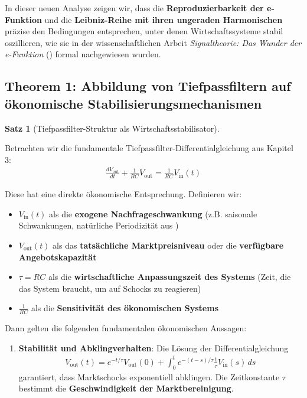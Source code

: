 \documentclass[a4paper,12pt,twoside]{report}
\theoremstyle{definition}
\newtheorem{satz}{Satz}
\begin{document}
In dieser neuen Analyse zeigen wir, dass die \textbf{Reproduzierbarkeit der e-Funktion} und die \textbf{Leibniz-Reihe mit ihren ungeraden Harmonischen} präzise den Bedingungen entsprechen, unter denen Wirtschaftssysteme stabil oszillieren, wie sie in der wissenschaftlichen Arbeit \textit{Signaltheorie: Das Wunder der e-Funktion} (\cite{epp_signal}) formal nachgewiesen wurden.

\subsection*{Theorem 1: Abbildung von Tiefpassfiltern auf ökonomische Stabilisierungsmechanismen}

\begin{satz}[Tiefpassfilter-Struktur als Wirtschaftsstabilisator]
\label{satz:tiefpass_oekonomie}

Betrachten wir die fundamentale Tiefpassfilter-Differentialgleichung aus Kapitel 3:
\begin{align}
\frac{dV_{\text{out}}}{dt} + \frac{1}{RC} V_{\text{out}} = \frac{1}{RC} V_{\text{in}}(t)
\end{align}

Diese hat eine direkte ökonomische Entsprechung. Definieren wir:
\begin{itemize}
\item $V_{\text{in}}(t)$ als die \textbf{exogene Nachfrageschwankung} (z.B. saisonale Schwankungen, natürliche Periodizität aus \cite{epp_signal})
\item $V_{\text{out}}(t)$ als das \textbf{tatsächliche Marktpreisniveau} oder die \textbf{verfügbare Angebotskapazität}
\item $\tau = RC$ als die \textbf{wirtschaftliche Anpassungszeit des Systems} (Zeit, die das System braucht, um auf Schocks zu reagieren)
\item $\frac{1}{RC}$ als die \textbf{Sensitivität des ökonomischen Systems}
\end{itemize}

Dann gelten die folgenden fundamentalen ökonomischen Aussagen:

\begin{enumerate}

\item \textbf{Stabilität und Abklingverhalten}: Die Lösung der Differentialgleichung
\begin{align}
V_{\text{out}}(t) = e^{-t/\tau} V_{\text{out}}(0) + \int_0^t e^{-(t-s)/\tau} \frac{1}{\tau} V_{\text{in}}(s) \, ds
\end{align}
garantiert, dass Marktschocks exponentiell abklingen. Die Zeitkonstante $\tau$ bestimmt die \textbf{Geschwindigkeit der Marktbereinigung}.


\end{enumerate}
\end{satz}
\end{document}
